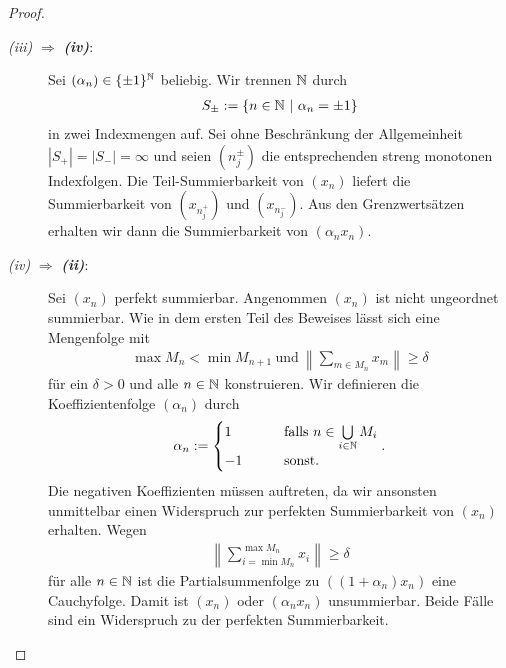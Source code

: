 \begin{proof}
\begin{description}
		\item[\textit{ \itshape\textrm{(iii)}} $ \Rightarrow $ \textbf{\textit{\textrm{(iv)}}}:]
		Sei $ (\alpha_n) \in \{\pm 1\}^{\mathbb{N}}$ beliebig.
		Wir trennen $ \mathbb{N} $ durch 
		\begin{align*}
			S_\pm := \{n \in \mathbb{N}  \ | \ \alpha_n = \pm 1 \}
		\end{align*} 
		in zwei Indexmengen auf. 
		Sei ohne Beschränkung der Allgemeinheit $ |S_+| = | S_- | = \infty $ und seien $ (n_j^\pm) $ die entsprechenden streng monotonen Indexfolgen.
		Die Teil-Summierbarkeit von $ (x_n) $ liefert die Summierbarkeit von $ (x_{n_j^+}) $ und $ (x_{n_j^-}) $.
		Aus den Grenzwertsätzen erhalten wir dann die Summierbarkeit von $ (\alpha_n x_n) $.
		\item[\textit{ \itshape\textrm{(iv)}} $ \Rightarrow $ \textbf{\textit{\textrm{(ii)}}}:]
		Sei $ (x_n) $ perfekt summierbar. Angenommen $ (x_n) $ ist nicht ungeordnet summierbar.
		Wie in dem ersten Teil des Beweises lässt sich eine Mengenfolge mit
		\begin{align*}
			\max  M_n < \min M_{n+1} 
			\ \textrm{und} \
			\left\| \sum \limits_{m \in M_n } x_m \right\| \geq \delta 
		\end{align*}
		für ein $ \delta > 0 $ und alle $ n \in \mathbb{N}  $ konstruieren.
		Wir definieren die Koeffizientenfolge $ (\alpha_n) $ durch
		\begin{align*}
			\alpha_n	
			:=
			\begin{cases}
				1 \quad &\quad  \textrm{falls } n \in \bigcup \limits_{i \in \mathbb{N}} M_i\\
				-1 \quad &\quad  \textrm{sonst.}
			\end{cases}.
		\end{align*}
		Die negativen Koeffizienten müssen auftreten, da wir ansonsten unmittelbar einen Widerspruch zur perfekten Summierbarkeit von $ (x_n) $ erhalten.
		Wegen 
		\begin{align*}
			\left\| \sum \limits_{i = \min M_n}^{\max M_n} x_i \right\| \geq \delta 
		\end{align*}
		für alle $ n \in \mathbb{N} $ ist die Partialsummenfolge zu $ ((1+ \alpha_n ) x_n) $ eine Cauchyfolge. Damit ist $ (x_n) $ oder $ (\alpha_n x_n)$ unsummierbar.
		Beide Fälle sind ein Widerspruch zu der perfekten Summierbarkeit.
	\end{description}
\end{proof}


